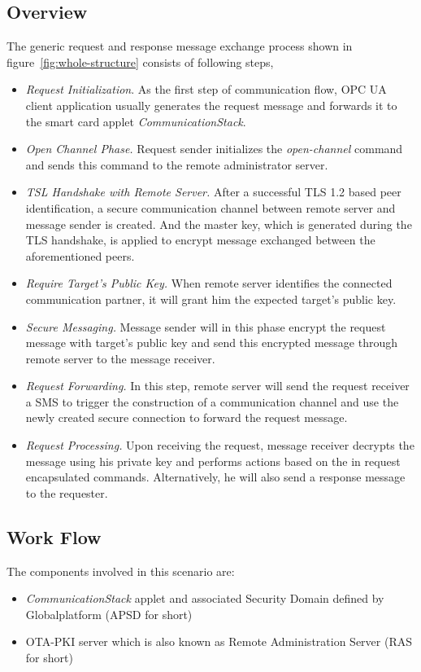 \subsection{Overview}
The generic request and response message exchange process shown in figure~\ref{fig:whole-structure} consists of following steps,
\begin{itemize}
\item \emph{Request Initialization}. As the first step of communication flow, OPC UA client application usually generates the request message and forwards it to the smart card applet \emph{CommunicationStack}.
\item \emph{Open Channel Phase.} Request sender initializes the \emph{open-channel} command and sends this command to the remote administrator server.
\item \emph{TSL Handshake with Remote Server.} After a successful TLS 1.2 based peer identification, a secure communication channel between remote server and message sender is created. And the master key, which is generated during the TLS handshake, is applied to encrypt message exchanged between the aforementioned peers.
\item \emph{Require Target's Public Key.} When remote server identifies the connected communication partner, it will grant him the expected target's public key. 
\item \emph{Secure Messaging.} Message sender will in this phase encrypt the request message with target's public key and send this encrypted message through remote server to the message receiver.
\item \emph{Request Forwarding.} In this step, remote server will send the request receiver a SMS to trigger the construction of a communication channel and use the newly created  secure connection to forward the request message. 
\item \emph{Request Processing.} Upon receiving the request, message receiver decrypts the message using his private key and performs actions based on the in request encapsulated commands. Alternatively, he will also send a response message to the requester.
\end{itemize}
\subsection {Work Flow}

The components involved in this scenario are:
 \begin{itemize}
  \item \emph{CommunicationStack} applet and associated Security Domain defined by Globalplatform (APSD  for short)
  \item OTA-PKI server which is also known as Remote Administration Server (RAS for short)
\end{itemize}

